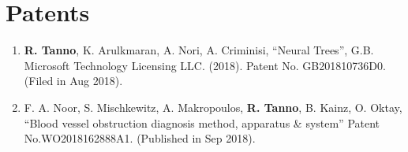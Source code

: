 \section*{Patents}
\begin{enumerate}
	\item  \textbf{R. Tanno}, K. Arulkmaran, A. Nori, A. Criminisi, “Neural Trees”, G.B. Microsoft Technology Licensing LLC. (2018). Patent No. GB201810736D0. (Filed in Aug 2018).
	\item F. A. Noor, S. Mischkewitz, A. Makropoulos, \textbf{R. Tanno}, B. Kainz, O. Oktay, “Blood vessel obstruction diagnosis method, apparatus \& system”  Patent No.WO2018162888A1. (Published in Sep 2018).
	
\end{enumerate}

